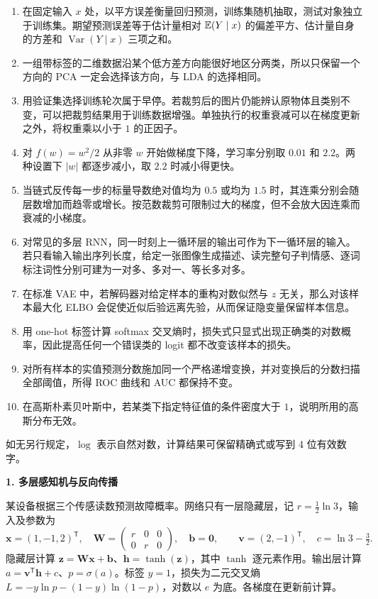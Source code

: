 \begin{enumerate}[label=\arabic*.,start=11]
\item \judge 在固定输入 $x$ 处，以平方误差衡量回归预测，训练集随机抽取，测试对象独立于训练集。期望预测误差等于估计量相对 $\mathbb{E}(Y\mid x)$ 的偏差平方、估计量自身的方差和 $\operatorname{Var}(Y\mid x)$ 三项之和。
\item \judge 一组带标签的二维数据沿某个低方差方向能很好地区分两类，所以只保留一个方向的 PCA 一定会选择该方向，与 LDA 的选择相同。
\item \judge 用验证集选择训练轮次属于早停。若裁剪后的图片仍能辨认原物体且类别不变，可以把裁剪结果用于训练数据增强。单独执行的权重衰减可以在梯度更新之外，将权重乘以小于 $1$ 的正因子。
\item \judge 对 $f(w)=w^2/2$ 从非零 $w$ 开始做梯度下降，学习率分别取 $0.01$ 和 $2.2$。两种设置下 $|w|$ 都逐步减小，取 $2.2$ 时减小得更快。
\item \judge 当链式反传每一步的标量导数绝对值均为 $0.5$ 或均为 $1.5$ 时，其连乘分别会随层数增加而趋零或增长。按范数裁剪可限制过大的梯度，但不会放大因连乘而衰减的小梯度。
\item \judge 对常见的多层 RNN，同一时刻上一循环层的输出可作为下一循环层的输入。若只看输入输出序列长度，给定一张图像生成描述、读完整句子判情感、逐词标注词性分别可建为一对多、多对一、等长多对多。
\item \judge 在标准 VAE 中，若解码器对给定样本的重构对数似然与 $z$ 无关，那么对该样本最大化 ELBO 会促使近似后验远离先验，从而保证隐变量保留样本信息。
\item \judge 用 one-hot 标签计算 softmax 交叉熵时，损失式只显式出现正确类的对数概率，因此提高任何一个错误类的 logit 都不改变该样本的损失。
\item \judge 对所有样本的实值预测分数施加同一个严格递增变换，并对变换后的分数扫描全部阈值，所得 ROC 曲线和 AUC 都保持不变。
\item \judge 在高斯朴素贝叶斯中，若某类下指定特征值的条件密度大于 $1$，说明所用的高斯分布无效。
\end{enumerate}


\noindent 如无另行规定，$\log$ 表示自然对数，计算结果可保留精确式或写到 4 位有效数字。

\noindent\textbf{1. 多层感知机与反向传播}

某设备根据三个传感读数预测故障概率。网络只有一层隐藏层，记 $r=\tfrac12\ln 3$，输入及参数为
\[
\bm{x}=(1,-1,2)^{\mathsf T},\quad
\bm{W}=\begin{pmatrix}r&0&0\\0&r&0\end{pmatrix},\quad \bm{b}=\bm{0},
\qquad \bm{v}=(2,-1)^{\mathsf T},\quad c=\ln 3-\tfrac32.
\]
隐藏层计算 $\bm{z}=\bm{W}\bm{x}+\bm{b}$、$\bm{h}=\tanh(\bm{z})$，其中 $\tanh$ 逐元素作用。输出层计算 $a=\bm{v}^{\mathsf T}\bm{h}+c$、$p=\sigma(a)$。标签 $y=1$，损失为二元交叉熵 $L=-y\ln p-(1-y)\ln(1-p)$，对数以 $e$ 为底。各梯度在更新前计算。

